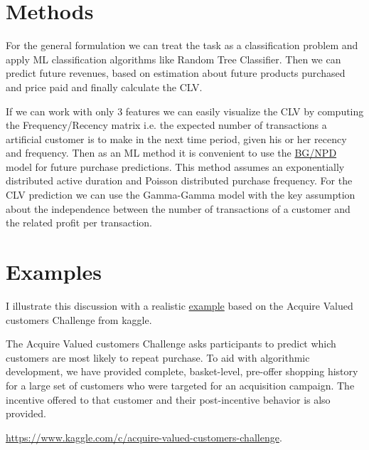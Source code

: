 \documentclass[11pt,fleqn]{book} %
\begin{document}
\begin{remark}
\section{Methods}
For the general formulation we can treat the task as a classification problem and apply ML classification algorithms like Random Tree Classifier. Then we can predict future revenues, based on estimation about future products purchased and price paid and finally calculate the CLV.

If we can work with only 3 features we can easily visualize the CLV by computing the Frequency/Recency matrix i.e. the expected number of transactions a artificial customer is to make in the next time period, given his or her recency and frequency. Then as an ML method it is convenient to use the \href{http://www45.essec.fr/professorsCV/showDeclFileRes.do?declId=8555&key=Publication-Content}{BG/NPD} model for future purchase predictions. This method assumes an exponentially distributed active duration and Poisson distributed purchase frequency. For the CLV prediction we can use the Gamma-Gamma model with the key assumption about the independence between the number of transactions of a customer and the related profit per transaction. 

\section{Examples}
I illustrate this discussion with a realistic \href{https://github.com/sergeplatonov/Data_problems/tree/master/Repeat%20purchase%20probability}{example} based on the Acquire Valued customers Challenge from kaggle.
\begin{remark}
The Acquire Valued customers Challenge asks participants to predict which customers are most likely to repeat purchase. To aid with algorithmic development, we have provided complete, basket-level, pre-offer shopping history for a large set of customers who were targeted for an acquisition campaign. The incentive offered to that customer and their post-incentive behavior is also provided.
\end{remark}
\url{https://www.kaggle.com/c/acquire-valued-customers-challenge}.



\end{remark}
\end{document}
